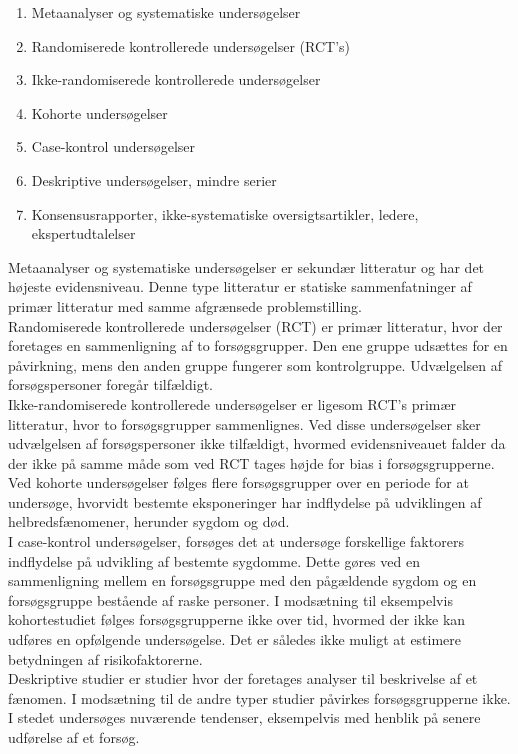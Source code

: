 \begin{enumerate}
\item Metaanalyser og systematiske undersøgelser 
\item Randomiserede kontrollerede undersøgelser (RCT’s)
\item Ikke-randomiserede kontrollerede undersøgelser
\item Kohorte undersøgelser
\item Case-kontrol undersøgelser
\item Deskriptive undersøgelser, mindre serier
\item Konsensusrapporter, ikke-systematiske oversigtsartikler, ledere, ekspertudtalelser
\end{enumerate}

Metaanalyser og systematiske undersøgelser er sekundær litteratur og har det højeste evidensniveau. Denne type litteratur er statiske sammenfatninger af primær litteratur med samme afgrænsede problemstilling. \citep{denstoredanske2009} \\
Randomiserede kontrollerede undersøgelser (RCT) er primær litteratur, hvor der foretages en sammenligning af to forsøgsgrupper. Den ene gruppe udsættes for en påvirkning, mens den anden gruppe fungerer som kontrolgruppe. Udvælgelsen af forsøgspersoner foregår tilfældigt. \citep{denstoredanske2009a} \\
Ikke-randomiserede kontrollerede undersøgelser er ligesom RCT’s primær litteratur, hvor to forsøgsgrupper sammenlignes. Ved disse undersøgelser sker udvælgelsen af forsøgspersoner ikke tilfældigt, hvormed evidensniveauet falder da der ikke på samme måde som ved RCT tages højde for bias i forsøgsgrupperne. \citep{denstoredanske2009a} \\
Ved kohorte undersøgelser følges flere forsøgsgrupper over en periode for at undersøge, hvorvidt bestemte eksponeringer har indflydelse på udviklingen af helbredsfænomener, herunder sygdom og død. \citep{metodehaandbogen} \\
I case-kontrol undersøgelser, forsøges det at undersøge forskellige faktorers indflydelse på udvikling af bestemte sygdomme. Dette gøres ved en sammenligning mellem en forsøgsgruppe med den pågældende sygdom og en forsøgsgruppe bestående af raske personer. I modsætning til eksempelvis kohortestudiet følges forsøgsgrupperne ikke over tid, hvormed der ikke kan udføres en opfølgende undersøgelse. Det er således ikke muligt at estimere betydningen af  risikofaktorerne. \citep{denstoredanske2012} \\
Deskriptive studier er studier hvor der foretages analyser til beskrivelse af et fænomen. I modsætning til de andre typer studier påvirkes forsøgsgrupperne ikke. I stedet undersøges nuværende tendenser, eksempelvis med henblik på senere udførelse af et forsøg. \citep{} \\
